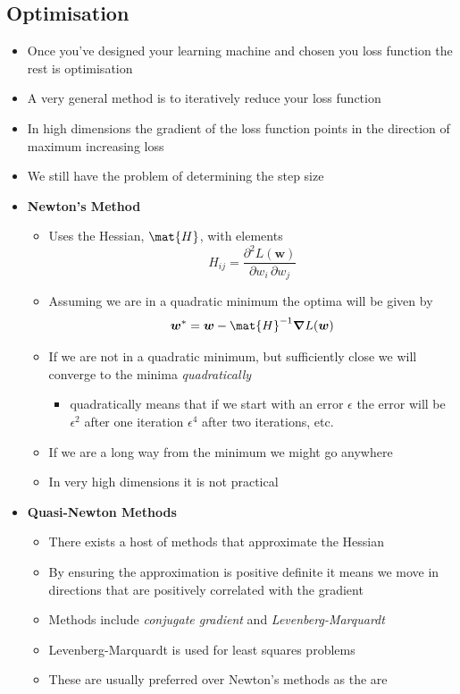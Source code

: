 \documentclass[11pt]{article}
\newcommand{\grad}{\bm{\nabla}}
\begin{document}
\subsection{Optimisation}
\label{sec:org9a5e75e}
\begin{itemize}
\item Once you've designed your learning machine and chosen you loss
function the rest is optimisation
\item A very general method is to iteratively reduce your loss function
\item In high dimensions the gradient of the loss function points in
the direction of maximum increasing loss
\item We still have the problem of determining the step size
\item \textbf{Newton's Method}
\begin{itemize}
\item Uses the Hessian, \(\mat{H}\), with elements
$$ H_{ij} = \frac{\partial^2 L(\bm{w})}{\partial w_i\,\partial w_j} $$
\item Assuming we are in a quadratic minimum the optima will be given by
$$ \bm{w}^* = \bm{w} - \mat{H}^{-1} \grad L(\bm{w}) $$
\item If we are not in a quadratic minimum, but sufficiently close we
will converge to the minima \emph{quadratically}
\begin{itemize}
\item quadratically means that if we start with an error \(\epsilon\)
the error will be \(\epsilon^2\) after one iteration
\(\epsilon^4\) after two iterations, etc.
\end{itemize}
\item If we are a long way from the minimum we might go anywhere
\item In very high dimensions it is not practical
\end{itemize}
\item \textbf{Quasi-Newton Methods}
\begin{itemize}
\item There exists a host of methods that approximate the Hessian
\item By ensuring the approximation is positive definite it means we
move in directions that are positively correlated with the gradient
\item Methods include \emph{conjugate gradient} and \emph{Levenberg-Marquardt}
\item Levenberg-Marquardt is used for least squares problems
\item These are usually preferred over Newton's methods as the are

\end{itemize}
\end{itemize}
\end{document}

